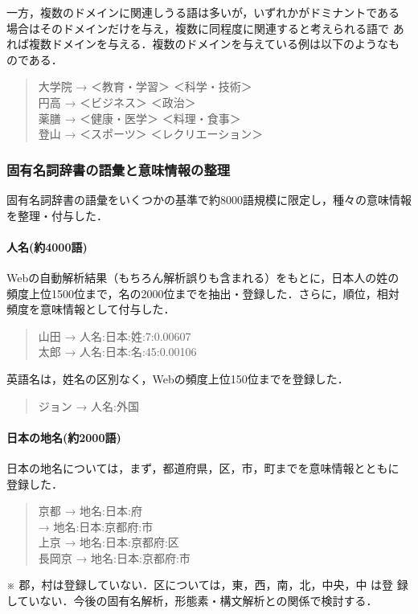 \documentclass[a4j,titlepage]{jarticle}
\begin{document}
一方，複数のドメインに関連しうる語は多いが，いずれかがドミナントである
場合はそのドメインだけを与え，複数に同程度に関連すると考えられる語で
あれば複数ドメインを与える．複数のドメインを与えている例は以下のようなも
のである．

\begin{quote}
大学院 → ＜教育・学習＞ ＜科学・技術＞ \\
円高 → ＜ビジネス＞ ＜政治＞ \\
薬膳 → ＜健康・医学＞ ＜料理・食事＞ \\
登山 → ＜スポーツ＞ ＜レクリエーション＞
\end{quote}


\subsubsection{固有名詞辞書の語彙と意味情報の整理}

固有名詞辞書の語彙をいくつかの基準で約8000語規模に限定し，種々の意味情報
を整理・付与した．

\paragraph{人名(約4000語)}

Webの自動解析結果（もちろん解析誤りも含まれる）をもとに，日本人の姓の
頻度上位1500位まで，名の2000位までを抽出・登録した．さらに，順位，相対
頻度を意味情報として付与した．

\begin{quote}
山田 → 人名:日本:姓:7:0.00607 \\
太郎 → 人名:日本:名:45:0.00106
\end{quote}

英語名は，姓名の区別なく，Webの頻度上位150位までを登録した．

\begin{quote}
ジョン → 人名:外国
\end{quote}

\paragraph{日本の地名(約2000語)}
日本の地名については，まず，都道府県，区，市，町までを意味情報とともに
登録した．

\begin{quote}
京都 → 地名:日本:府 \\
     → 地名:日本:京都府:市 \\
上京 → 地名:日本:京都府:区 \\
長岡京 → 地名:日本:京都府:市 \\
\end{quote}
※ 郡，村は登録していない．区については，東，西，南，北，中央，中 は登
録していない．今後の固有名解析，形態素・構文解析との関係で検討する．
\end{document}
